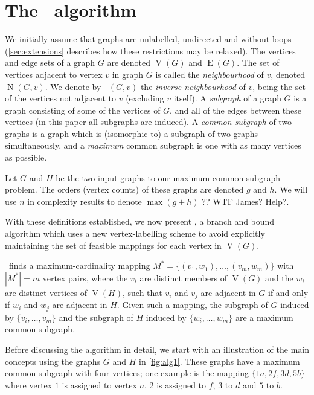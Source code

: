 \documentclass[letterpaper]{article}
\newcommand{\McSplit}{\textproc{McSplit}}
\DeclareMathOperator{\V}{V}
\DeclareMathOperator{\E}{E}
\DeclareMathOperator{\N}{N}
\DeclareMathOperator{\invN}{\overline{N}}
\begin{document}
\section{The \McSplit\ algorithm}

We initially assume that graphs are unlabelled, undirected and without loops
(\cref{sec:extensions} describes how these restrictions may be relaxed).
The vertices and edge sets of a graph $G$ are denoted $\V(G)$ and $\E(G)$.  The
set of vertices adjacent to vertex $v$ in graph $G$ is called the
\emph{neighbourhood} of $v$, denoted $\N(G, v)$. We denote by $\invN(G, v)$ the
\emph{inverse neighbourhood} of $v$, being the set of the vertices not adjacent
to $v$ (excluding $v$ itself). A \emph{subgraph} of a graph $G$ is a graph
consisting of some of the vertices of $G$, and all of the edges between these
vertices (in this paper all subgraphs are induced). A \emph{common subgraph} of
two graphs is a graph which is (isomorphic to) a subgraph of two graphs
simultaneously, and a \emph{maximum} common subgraph is one with as many
vertices as possible.

Let $G$ and $H$ be the two input graphs to our maximum common subgraph problem.
The orders (vertex counts) of these graphs are denoted $g$ and $h$. We will
use $n$ in complexity results to denote $\max(g + h)$ ?? WTF James? Help?.

With these definitions established, we now present \McSplit, a branch and bound
algorithm which uses a new vertex-labelling scheme to avoid explicitly
maintaining the set of feasible mappings for each vertex in $\V(G)$.

\McSplit\ finds a maximum-cardinality mapping $M^* = \{(v_1, w_1), \dots,
(v_{m}, w_{m})\}$ with $|M^*| = m$ vertex pairs, where the $v_i$ are distinct members of $\V(G)$ and the
$w_i$ are distinct vertices of $\V(H)$, such that $v_i$ and $v_j$ are adjacent
in $G$ if and only if $w_i$ and $w_j$ are adjacent in $H$. 
Given such a mapping, the subgraph of $G$ induced by $\{v_i, \dots, v_{m}\}$
and the subgraph of $H$ induced by $\{w_i, \dots, w_{m}\}$ are a maximum
common subgraph.

Before discussing the algorithm in detail, we start with an illustration of the
main concepts using the graphs $G$ and $H$ in \cref{fig:alg1}.  These graphs
have a maximum common subgraph with four vertices; one example is the mapping
$\{1a, 2f, 3d, 5b\}$ where vertex $1$ is assigned to vertex $a$, $2$ is
assigned to $f$, $3$ to $d$ and $5$ to $b$.
\end{document}
